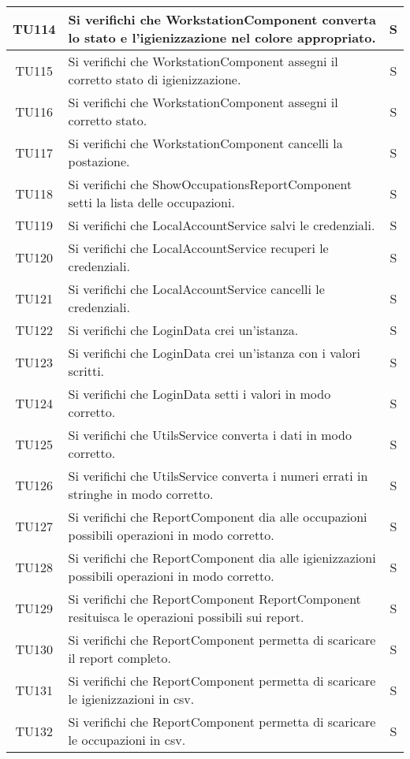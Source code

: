 \begin{center}
\begin{longtable}{|c|p{10cm}|c|}
			
			TU114 & Si verifichi che WorkstationComponent converta lo stato e l'igienizzazione nel colore appropriato.  & S \\
			\hline
			TU115 & Si verifichi che WorkstationComponent assegni il corretto stato di igienizzazione. & S \\
			\hline
			TU116 & Si verifichi che WorkstationComponent assegni il corretto stato. & S \\
			\hline
			TU117 & Si verifichi che WorkstationComponent cancelli la postazione.  & S \\
			\hline
			TU118 & Si verifichi che ShowOccupationsReportComponent setti la lista delle occupazioni.   & S \\
			\hline
			TU119 & Si verifichi che LocalAccountService salvi le credenziali.  & S \\
			\hline
			TU120 & Si verifichi che LocalAccountService recuperi le credenziali.  & S \\
			\hline
			TU121 & Si verifichi che LocalAccountService cancelli le credenziali.  & S \\
			\hline
			TU122 & Si verifichi che LoginData crei un'istanza.  & S \\
			\hline
			TU123 & Si verifichi che LoginData crei un'istanza con i valori scritti.  & S \\
			\hline
			TU124 & Si verifichi che LoginData setti i valori in modo corretto.  & S \\
			\hline 
			TU125 & Si verifichi che UtilsService converta i dati in modo corretto.  & S \\
			\hline
			TU126 & Si verifichi che UtilsService converta i numeri errati in stringhe in modo corretto.  & S \\
			\hline
			TU127 & Si verifichi che ReportComponent dia alle occupazioni possibili operazioni in modo corretto. & S \\
			\hline
			TU128 & Si verifichi che ReportComponent dia alle igienizzazioni possibili operazioni in modo corretto.  & S \\
			\hline
			TU129 & Si verifichi che ReportComponent ReportComponent resituisca le operazioni possibili sui report.  & S \\
			\hline
			TU130 & Si verifichi che ReportComponent permetta di scaricare il report completo. & S \\
			\hline
			TU131 & Si verifichi che ReportComponent permetta di scaricare le igienizzazioni in csv.   & S \\
			\hline
			TU132 & Si verifichi che ReportComponent permetta di scaricare le occupazioni in csv.  & S \\

\end{longtable}
\end{center}
